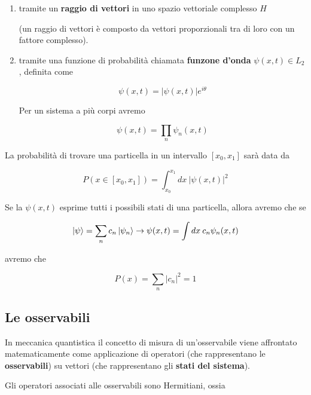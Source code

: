	\begin{enumerate}
		
		\item tramite un \textbf{raggio di vettori} in uno spazio vettoriale complesso $H$ 
		
		(un raggio di vettori è composto da vettori proporzionali tra di loro con un fattore complesso).
		
		\item tramite una funzione di probabilità chiamata \textbf{funzone d'onda} $\psi(x,t) \in L_2$, definita come
	
	\begin{equation}
	\psi(x,t)= |\psi(x,t)|e^{i\theta}
	\end{equation}
	
	Per un sistema a più corpi avremo
		
	\begin{equation}
	\psi(x,t)= \prod_{n} \psi_n(x,t)
	\end{equation}
	\end{enumerate}

La probabilità di trovare una particella in un intervallo $[x_0, x_1]$ sarà data da 	

	\begin{equation}
	P(x \in [x_0, x_1])= \int_{x_0}^{x_1} dx \: |\psi(x,t)|^2
	\end{equation}

 Se la $\psi(x,t)$ esprime tutti i possibili stati di una particella, allora avremo che se 
	
	\begin{equation}
	\ket{\psi}= \sum_{n}c_n \ket{\psi_n} \rightarrow \psi(x,t)= \int dx \: c_n \psi_n(x,t)
	\end{equation}
	
avremo che
	
	\begin{equation}
	P(x)= \sum_{n} |c_n|^2= 1 
	\end{equation}
		
\subsection{Le osservabili}

In meccanica quantistica il concetto di misura di un'osservabile viene affrontato matematicamente come applicazione di operatori (che rappresentano le \textbf{osservabili}) su vettori (che rappresentano gli \textbf{stati del sistema}). 

Gli operatori associati alle osservabili sono Hermitiani, ossia 

